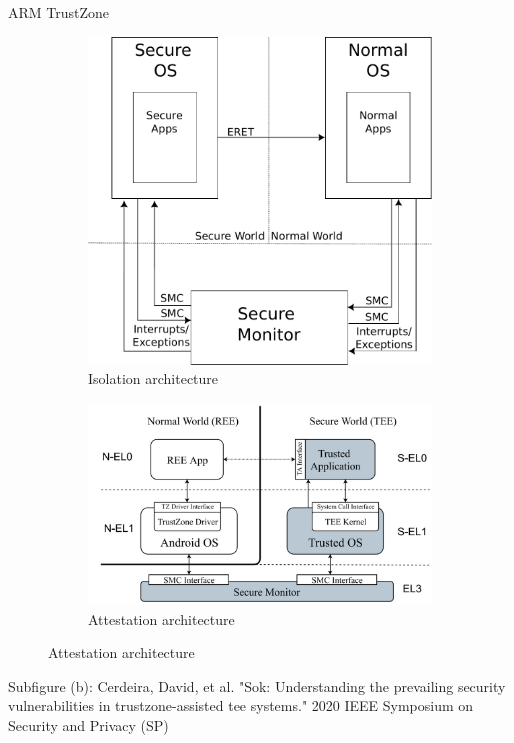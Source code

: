 \documentclass[aspectratio=169]{beamer}
\begin{document}
\begin{frame}{ARM TrustZone}
    \begin{figure}
        \begin{subfigure}[]{0.35\textwidth}
            \includegraphics[width=\textwidth]{images/trustzone_components.pdf}
            \caption{Isolation architecture}
        \end{subfigure}
        \begin{subfigure}[]{0.45\textwidth}
            \includegraphics[width=\textwidth]{images/trustzone_tee.png}
            \caption{Attestation architecture}
        \end{subfigure}
    \end{figure}
    \footnotesize{Subfigure (b): Cerdeira, David, et al. "Sok: Understanding the prevailing security vulnerabilities in trustzone-assisted tee systems." 2020 IEEE Symposium on Security and Privacy (SP)}
\end{frame}
\end{document}
